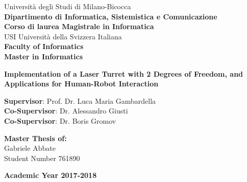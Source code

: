 \documentclass[a4paper,12pt,twoside,openright]{book}
\newcommand{\titolo}{Implementation of a Laser Turret with 2 Degrees of Freedom, and Applications for Human-Robot Interaction}
\newcommand{\autore}{Gabriele Abbate}
\newcommand{\matricola}{761890}
\newcommand{\relatore}{Prof. Dr. Luca Maria Gambardella}
\newcommand{\correlatoreA}{Dr. Alessandro Giusti}
\newcommand{\correlatoreB}{Dr. Boris Gromov}
\begin{document}



\begin{titlepage}
	\begin{minipage}{0.30\linewidth}
	\end{minipage}	
	\begin{minipage}{0.67\linewidth}
		\begin{flushleft}
			{\large Università degli Studi di Milano-Bicocca} \\[0.4cm]
			{\large \bfseries Dipartimento di Informatica, Sistemistica e Comunicazione} \\[0.4cm]
			{\large  \bfseries Corso di laurea Magistrale in Informatica}\\
			\vspace*{1.5cm}
			{\large USI Università della Svizzera Italiana} \\[0.4cm]
			{\large \bfseries Faculty of Informatics} \\[0.4cm]
			{\large  \bfseries Master in Informatics}
		\end{flushleft}
	\end{minipage}
	\begin{center}
		\vspace*{4cm}
		{ \huge \bfseries \titolo} \\[0.1cm]
	\end{center}
	\vspace*{2cm}
	\begin{flushleft}
		{\Large \textbf{Supervisor}: \relatore} \\[0.4cm]
		{\Large \textbf{Co-Supervisor}: \correlatoreA} \\[0.4cm]
		{\Large \textbf{Co-Supervisor}: \correlatoreB} \\[0.4cm]
	\end{flushleft}
	\vspace*{2cm}
	\begin{flushright}
		{\Large \textbf{Master Thesis of:}} \\[0.4cm]
		{\Large \autore} \\[0.2cm]
		{\Large Student Number \matricola} \\
	\end{flushright}
	\vfill
	\begin{center}
		{\Large \textbf{Academic Year 2017-2018}}
		\vspace*{1cm}
	\end{center}
	
\end{titlepage}
\end{document}
